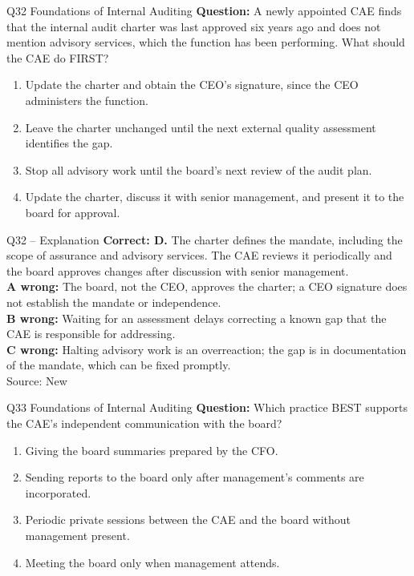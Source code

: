 \documentclass[aspectratio=169,10pt]{beamer}
\begin{document}
\begin{frame}[t]{Q32 \hfill {\scriptsize Foundations of Internal Auditing}}
	\small
	\textbf{Question:} A newly appointed CAE finds that the internal audit charter was last approved six years ago and does not mention advisory services, which the function has been performing. What should the CAE do FIRST?
	\begin{enumerate}[label=\Alph*.,itemsep=1pt,topsep=3pt]
			\item Update the charter and obtain the CEO's signature, since the CEO administers the function.
			\item Leave the charter unchanged until the next external quality assessment identifies the gap.
			\item Stop all advisory work until the board's next review of the audit plan.
			\item Update the charter, discuss it with senior management, and present it to the board for approval.
	\end{enumerate}
\end{frame}

\begin{frame}[t]{Q32 -- Explanation}
	\footnotesize
	\textbf{Correct: D.} The charter defines the mandate, including the scope of assurance and advisory services. The CAE reviews it periodically and the board approves changes after discussion with senior management. \\[5pt]
\textbf{A wrong:} The board, not the CEO, approves the charter; a CEO signature does not establish the mandate or independence. \\[3pt]
\textbf{B wrong:} Waiting for an assessment delays correcting a known gap that the CAE is responsible for addressing. \\[3pt]
\textbf{C wrong:} Halting advisory work is an overreaction; the gap is in documentation of the mandate, which can be fixed promptly. \\[3pt]
	\vfill {\tiny Source: New}
\end{frame}

\begin{frame}[t]{Q33 \hfill {\scriptsize Foundations of Internal Auditing}}
	\small
	\textbf{Question:} Which practice BEST supports the CAE's independent communication with the board?
	\begin{enumerate}[label=\Alph*.,itemsep=1pt,topsep=3pt]
			\item Giving the board summaries prepared by the CFO.
			\item Sending reports to the board only after management's comments are incorporated.
			\item Periodic private sessions between the CAE and the board without management present.
			\item Meeting the board only when management attends.
	\end{enumerate}
\end{frame}
\end{document}
